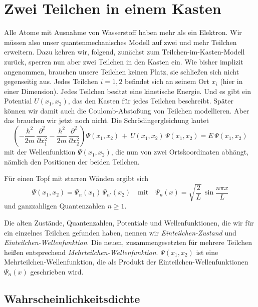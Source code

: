 \section{Zwei Teilchen in einem Kasten}

Alle Atome mit Ausnahme von Wasserstoff haben mehr als ein Elektron. Wir müssen also unser quantenmechanisches Modell auf zwei und mehr Teilchen erweitern. Dazu kehren wir, \cite{Harris_moderne_Physik} folgend, zunächst zum Teilchen-im-Kasten-Modell zurück, sperren nun aber zwei Teilchen in den Kasten ein. Wie bisher implizit angenommen, brauchen unsere Teilchen keinen Platz, sie schließen sich nicht gegenseitig aus. Jedes Teilchen $i=1,2$ befindet sich an seinem Ort $x_i$ (hier in einer Dimension). Jedes Teilchen besitzt eine kinetische Energie. Und es gibt ein Potential $U(x_1, x_2)$, das den Kasten für jedes Teilchen beschreibt. Später können wir damit auch die Coulomb-Abstoßung von Teilchen modellieren. Aber das brauchen wir jetzt noch nicht. Die Schrödingergleichung lautet
\begin{equation}
    \left(
        - \frac{\hbar^2}{2m} \, \frac{\partial^2}{\partial x_1^2} 
        - \frac{\hbar^2}{2m} \, \frac{\partial^2}{\partial x_2^2} 
     \right)
     \Psi(x_1, x_2)
     \, + \,
     U(x_1, x_2) \, \Psi(x_1, x_2)
     = E \, \Psi(x_1, x_2)
\end{equation}
mit der Wellenfunktion $\Psi(x_1, x_2)$, die nun von zwei Ortskoordinaten abhängt, nämlich den Positionen der beiden Teilchen.

Für einen Topf mit starren Wänden ergibt sich
\begin{equation}
    \Psi(x_1, x_2) = \Psi_{n}(x_1) \, \Psi_{n'}(x_2) \quad
    \text{mit} \quad \Psi_n(x) = \sqrt{\frac{2}{L}} \, \sin \frac{n \pi x}{L}
\end{equation}
und ganzzahligen Quantenzahlen $n \ge 1$.

Die alten Zustände, Quantenzahlen, Potentiale und Wellenfunktionen, die wir für ein einzelnes Teilchen gefunden haben, nennen wir \emph{Einteilchen-Zustand} und \emph{Einteilchen-Wellenfunktion}. Die neuen, zusammengesetzten für mehrere Teilchen heißen entsprechend \emph{Mehrteilchen-Wellenfunktion}. $\Psi(x_1, x_2)$ ist eine Mehrteilchen-Wellenfunktion, die als Produkt der Einteilchen-Wellenfunktionen $ \Psi_n(x)$ geschrieben wird.

\subsection{Wahrscheinlichkeitsdichte}

